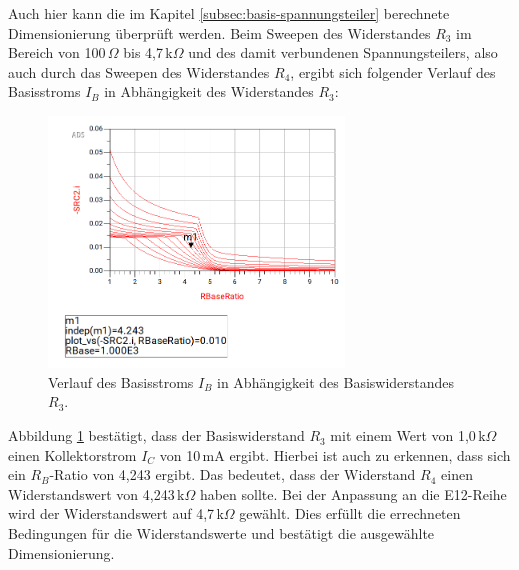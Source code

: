 Auch hier kann die im Kapitel \ref{subsec:basis-spannungsteiler} berechnete Dimensionierung überprüft werden. Beim Sweepen des Widerstandes $R_3$ im Bereich von 100\,\(\Omega\) bis 4,7\,k\(\Omega\) und des damit verbundenen Spannungsteilers, also auch durch das Sweepen des Widerstandes $R_4$, ergibt sich folgender Verlauf des Basisstroms $I_B$ in Abhängigkeit des Widerstandes $R_3$:
\begin{figure}[H]
    \centering
    \includegraphics[width=0.7\textwidth]{Pictures/RBase.png}
    \caption{Verlauf des Basisstroms $I_B$ in Abhängigkeit des Basiswiderstandes $R_3$.}
    \label{fig:RBase}
\end{figure}
Abbildung \ref{fig:RBase} bestätigt, dass der Basiswiderstand $R_3$ mit einem Wert von 1{,}0\,k\(\Omega\) einen Kollektorstrom $I_C$ von 10\,mA ergibt. Hierbei ist auch zu erkennen, dass sich ein $R_B$-Ratio von 4,243 ergibt. 
Das bedeutet, dass der Widerstand $R_4$ einen Widerstandswert von 4{,}243\,k\(\Omega\) haben sollte. Bei der Anpassung an die E12-Reihe wird der Widerstandswert auf 4{,}7\,k\(\Omega\) gewählt. 
Dies erfüllt die errechneten Bedingungen für die Widerstandswerte und bestätigt die ausgewählte Dimensionierung.

